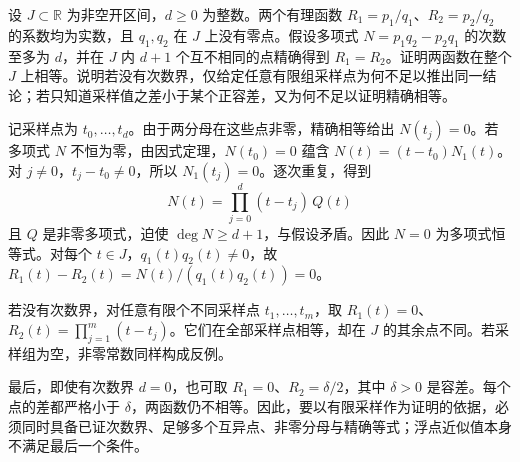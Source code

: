 \begin{exercise}\label{g1:ex:finite-exact-polynomial-samples}
	设 \(J\subset\mathbb R\) 为非空开区间，\(d\ge0\) 为整数。两个有理函数 \(R_1=p_1/q_1\)、\(R_2=p_2/q_2\) 的系数均为实数，且 \(q_1,q_2\) 在 \(J\) 上没有零点。假设多项式 \(N=p_1q_2-p_2q_1\) 的次数至多为 \(d\)，并在 \(J\) 内 \(d+1\) 个互不相同的点精确得到 \(R_1=R_2\)。证明两函数在整个 \(J\) 上相等。说明若没有次数界，仅给定任意有限组采样点为何不足以推出同一结论；若只知道采样值之差小于某个正容差，又为何不足以证明精确相等。
\end{exercise}
\begin{solution}
	记采样点为 \(t_0,\ldots,t_d\)。由于两分母在这些点非零，精确相等给出 \(N(t_j)=0\)。若多项式 \(N\) 不恒为零，由因式定理，\(N(t_0)=0\) 蕴含 \(N(t)=(t-t_0)N_1(t)\)。对 \(j\ne0\)，\(t_j-t_0\ne0\)，所以 \(N_1(t_j)=0\)。逐次重复，得到
	\[
		N(t)=\prod_{j=0}^d(t-t_j)\,Q(t)
	\]
	且 \(Q\) 是非零多项式，迫使 \(\deg N\ge d+1\)，与假设矛盾。因此 \(N=0\) 为多项式恒等式。对每个 \(t\in J\)，\(q_1(t)q_2(t)\ne0\)，故 \(R_1(t)-R_2(t)=N(t)/(q_1(t)q_2(t))=0\)。

	若没有次数界，对任意有限个不同采样点 \(t_1,\ldots,t_m\)，取 \(R_1(t)=0\)、\(R_2(t)=\prod_{j=1}^m(t-t_j)\)。它们在全部采样点相等，却在 \(J\) 的其余点不同。若采样组为空，非零常数同样构成反例。

	最后，即使有次数界 \(d=0\)，也可取 \(R_1=0\)、\(R_2=\delta/2\)，其中 \(\delta>0\) 是容差。每个点的差都严格小于 \(\delta\)，两函数仍不相等。因此，要以有限采样作为证明的依据，必须同时具备已证次数界、足够多个互异点、非零分母与精确等式；浮点近似值本身不满足最后一个条件。
\end{solution}

